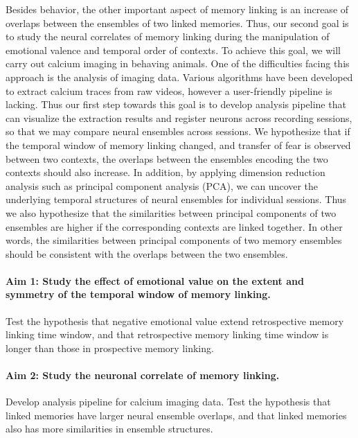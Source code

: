 \documentclass[master.tex]{subfiles}
\begin{document}
Besides behavior, the other important aspect of memory linking is an increase of
overlaps between the ensembles of two linked memories. Thus, our second goal is
to study the neural correlates of memory linking during the manipulation of
emotional valence and temporal order of contexts. To achieve this goal, we will
carry out calcium imaging in behaving animals. One of the difficulties facing
this approach is the analysis of imaging data. Various algorithms have been
developed to extract calcium traces from raw videos, however a user-friendly
pipeline is lacking. Thus our first step towards this goal is to develop
analysis pipeline that can visualize the extraction results and register neurons
across recording sessions, so that we may compare neural ensembles across
sessions. We hypothesize that if the temporal window of memory linking changed,
and transfer of fear is observed between two contexts, the overlaps between the
ensembles encoding the two contexts should also increase. In addition, by
applying dimension reduction analysis such as principal component analysis
(PCA), we can uncover the underlying temporal structures of neural ensembles for
individual sessions. Thus we also hypothesize that the similarities between
principal components of two ensembles are higher if the corresponding contexts
are linked together. In other words, the similarities between principal
components of two memory ensembles should be consistent with the overlaps
between the two ensembles.

\paragraph{Aim 1: Study the effect of emotional value on the extent and symmetry
  of the temporal window of memory linking.} Test the hypothesis that negative
emotional value extend retrospective memory linking time window, and that
retrospective memory linking time window is longer than those in prospective
memory linking.

\paragraph{Aim 2: Study the neuronal correlate of memory linking.} Develop
analysis pipeline for calcium imaging data. Test the
hypothesis that linked memories have larger neural ensemble overlaps, and that
linked memories also has more similarities in ensemble structures.

\newpage
\end{document}
